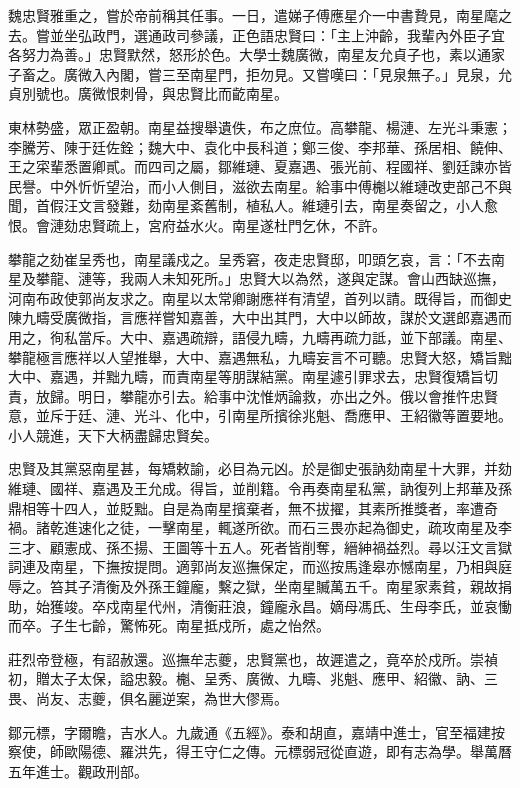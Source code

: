 \begin{pinyinscope}
魏忠賢雅重之，嘗於帝前稱其任事。一日，遣娣子傅應星介一中書贄見，南星麾之去。嘗並坐弘政門，選通政司參議，正色語忠賢曰：「主上沖齡，我輩內外臣子宜各努力為善。」忠賢默然，怒形於色。大學士魏廣微，南星友允貞子也，素以通家子畜之。廣微入內閣，嘗三至南星門，拒勿見。又嘗嘆曰：「見泉無子。」見泉，允貞別號也。廣微恨刺骨，與忠賢比而齕南星。

東林勢盛，眾正盈朝。南星益搜舉遺佚，布之庶位。高攀龍、楊漣、左光斗秉憲；李騰芳、陳于廷佐銓；魏大中、袁化中長科道；鄭三俊、李邦華、孫居相、饒伸、王之寀輩悉置卿貳。而四司之屬，鄒維璉、夏嘉遇、張光前、程國祥、劉廷諫亦皆民譽。中外忻忻望治，而小人側目，滋欲去南星。給事中傅櫆以維璉改吏部己不與聞，首假汪文言發難，劾南星紊舊制，植私人。維璉引去，南星奏留之，小人愈恨。會漣劾忠賢疏上，宮府益水火。南星遂杜門乞休，不許。

攀龍之劾崔呈秀也，南星議戍之。呈秀窘，夜走忠賢邸，叩頭乞哀，言：「不去南星及攀龍、漣等，我兩人未知死所。」忠賢大以為然，遂與定謀。會山西缺巡撫，河南布政使郭尚友求之。南星以太常卿謝應祥有清望，首列以請。既得旨，而御史陳九疇受廣微指，言應祥嘗知嘉善，大中出其門，大中以師故，謀於文選郎嘉遇而用之，徇私當斥。大中、嘉遇疏辯，語侵九疇，九疇再疏力詆，並下部議。南星、攀龍極言應祥以人望推舉，大中、嘉遇無私，九疇妄言不可聽。忠賢大怒，矯旨黜大中、嘉遇，并黜九疇，而責南星等朋謀結黨。南星遽引罪求去，忠賢復矯旨切責，放歸。明日，攀龍亦引去。給事中沈惟炳論救，亦出之外。俄以會推忤忠賢意，並斥于廷、漣、光斗、化中，引南星所擯徐兆魁、喬應甲、王紹徽等置要地。小人競進，天下大柄盡歸忠賢矣。

忠賢及其黨惡南星甚，每矯敕諭，必目為元凶。於是御史張訥劾南星十大罪，并劾維璉、國祥、嘉遇及王允成。得旨，並削籍。令再奏南星私黨，訥復列上邦華及孫鼎相等十四人，並貶黜。自是為南星擯棄者，無不拔擢，其素所推獎者，率遭奇禍。諸乾進速化之徒，一擊南星，輒遂所欲。而石三畏亦起為御史，疏攻南星及李三才、顧憲成、孫丕揚、王圖等十五人。死者皆削奪，縉紳禍益烈。尋以汪文言獄詞連及南星，下撫按提問。適郭尚友巡撫保定，而巡按馬逢皋亦憾南星，乃相與庭辱之。笞其子清衡及外孫王鐘龐，繫之獄，坐南星贓萬五千。南星家素貧，親故捐助，始獲竣。卒戍南星代州，清衡莊浪，鐘龐永昌。嫡母馮氏、生母李氏，並哀慟而卒。子生七齡，驚怖死。南星抵戍所，處之怡然。

莊烈帝登極，有詔赦還。巡撫牟志夔，忠賢黨也，故遲遣之，竟卒於戍所。崇禎初，贈太子太保，謚忠毅。櫆、呈秀、廣微、九疇、兆魁、應甲、紹徽、訥、三畏、尚友、志夔，俱名麗逆案，為世大僇焉。

鄒元標，字爾瞻，吉水人。九歲通《五經》。泰和胡直，嘉靖中進士，官至福建按察使，師歐陽德、羅洪先，得王守仁之傳。元標弱冠從直遊，即有志為學。舉萬曆五年進士。觀政刑部。


\end{pinyinscope}
